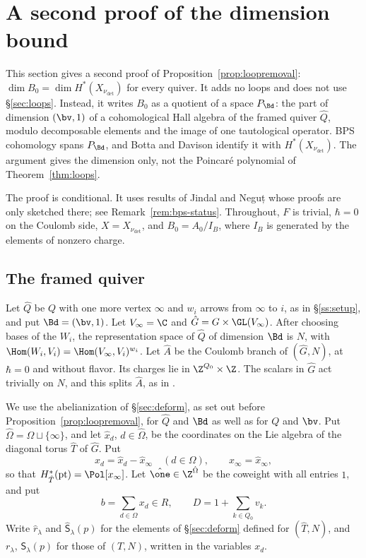 \section{A second proof of the dimension bound}\label{sec:bps}


This section gives a second proof of Proposition~\ref{prop:loopremoval}:
$\dim B_0=\dim H^*(X_{\nu_{\det}})$ for every quiver.  It adds no loops and
does not use \S\ref{sec:loops}.  Instead, it writes $B_0$ as a quotient of a
space $P_\Bd$: the part of dimension $(\bv,1)$ of a cohomological Hall algebra
of the framed quiver $\hat Q$, modulo decomposable elements and the image of
one tautological operator.  BPS cohomology spans $P_\Bd$, and Botta and
Davison identify it with $H^*(X_{\nu_{\det}})$.  The argument gives the
dimension only, not the Poincar\'e polynomial of Theorem~\ref{thm:loops}.

The proof is conditional.  It uses results of Jindal and Neguț
\cite{jindalLoopNilpotent2026} whose proofs are only sketched there; see
Remark~\ref{rem:bps-status}.  Throughout, $F$ is trivial, $\hbar=0$ on the
Coulomb side, $X=X_{\nu_{\det}}$, and $B_0=A_0/I_B$, where $I_B$ is generated
by the elements of nonzero charge.

\subsection{The framed quiver}\label{ss:bps-framed}
Let $\hat Q$ be $Q$ with one more vertex $\infty$ and $w_i$ arrows from
$\infty$ to $i$, as in \S\ref{ss:setup}, and put $\Bd=(\bv,1)$.  Let
$V_\infty=\C$ and $\hat G=G\times\GL(V_\infty)$.  After choosing bases of the
$W_i$, the representation space of $\hat Q$ of dimension $\Bd$ is $N$, with
$\Hom(W_i,V_i)=\Hom(V_\infty,V_i)^{w_i}$.  Let $\hat A$ be the Coulomb branch
of $(\hat G,N)$, at $\hbar=0$ and without flavor.  Its charges lie in
$\Z^{Q_0}\times\Z$.  The scalars in $\hat G$ act trivially on $N$, and this
splits $\hat A$, as in .

We use the abelianization of \S\ref{sec:deform}, as set out before
Proposition~\ref{prop:loopremoval}, for $\hat Q$ and $\Bd$ as well as for $Q$
and $\bv$.  Put $\hat\Omega=\Omega\sqcup\{\infty\}$, and let $\hat x_d$,
$d\in\hat\Omega$, be the coordinates on the Lie algebra of the diagonal torus
$\hat T$ of $\hat G$.  Put
\[
 x_d=\hat x_d-\hat x_\infty\quad(d\in\Omega),\qquad x_\infty=\hat x_\infty,
\]
so that $H^*_{\hat T}(\mathrm{pt})=\Pol[x_\infty]$.  Let $\hat\one\in\Z^{\hat\Omega}$
be the coweight with all entries $1$, and put
\[
 b=\sum_{d\in\Omega}x_d\in R,\qquad D=1+\sum_{k\in Q_0}v_k .
\]
Write $\hat r_\lambda$ and $\hat{\mathsf S}_\lambda(p)$ for the elements of
\S\ref{sec:deform} defined for $(\hat T,N)$, and $r_\lambda$, $\mathsf
S_\lambda(p)$ for those of $(T,N)$, written in the variables $x_d$.

